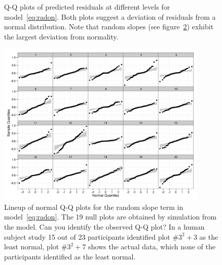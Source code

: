 \documentclass[12pt]{article} %
\begin{document}
\begin{figure}[!h]
	\centering
	\caption{\label{fig:qqplots1} Q-Q plots of predicted residuals at different levels %
	for model~\eqref{eq:radon}. Both plots suggest a deviation of residuals from a normal distribution. Note that random slopes (see figure~\ref{fig:lineup}) exhibit the largest deviation from normality. }
\end{figure}

\begin{figure}[htb]
	\centering
	\includegraphics[width=0.9\textwidth]{test.jpeg}%
	\caption{\label{fig:lineup} Lineup of normal Q-Q plots for the random slope term in model~\eqref{eq:radon}. The 19 null plots are obtained by simulation from the model. Can you identify the observed Q-Q plot?  In a human subject study 15 out of 23 participants identified plot \#$3^2+3$ as the least normal, plot \#$3^2+7$ shows the actual data, which none of the participants identified as the least normal. }
\end{figure}
\end{document}
